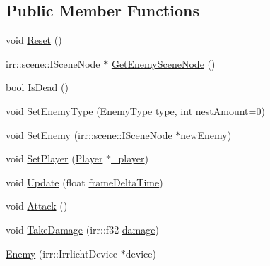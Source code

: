 \subsection*{Public Member Functions}
\begin{DoxyCompactItemize}
\item 
void \hyperlink{class_enemy_af6c878494349e5158e9e2f5ccbebe22d}{Reset} ()
\item 
irr\-::scene\-::\-I\-Scene\-Node $\ast$ \hyperlink{class_enemy_a85b8d7d8c6a61f8824a3b7b3fea795f4}{Get\-Enemy\-Scene\-Node} ()
\item 
bool \hyperlink{class_enemy_a019dd82194ff8415b0439cc375a88545}{Is\-Dead} ()
\item 
void \hyperlink{class_enemy_a567a82f1d7cb9034509459850f7784fc}{Set\-Enemy\-Type} (\hyperlink{class_enemy_a98c2ee2c2081001de17a4bc9fa8da94f}{Enemy\-Type} type, int nest\-Amount=0)
\item 
void \hyperlink{class_enemy_a927846998a0a936374a5734fb832b151}{Set\-Enemy} (irr\-::scene\-::\-I\-Scene\-Node $\ast$new\-Enemy)
\item 
void \hyperlink{class_enemy_a421d67f70801a3399ca22067fcde6dff}{Set\-Player} (\hyperlink{class_player}{Player} $\ast$\hyperlink{_enemy_spawner_8cpp_a9cd078164ceb4e9bfed2981b94610dc9}{\-\_\-player})
\item 
void \hyperlink{class_enemy_a2429c6f39d0b763f899bef2c035fa9c8}{Update} (float \hyperlink{_player_8cpp_adc988571147642cda93afbf89783f9c9}{frame\-Delta\-Time})
\item 
void \hyperlink{class_enemy_a9d077112e9af9e0bf92aa73ec20ea6ae}{Attack} ()
\item 
void \hyperlink{class_enemy_ab3567fe4213734615d7f3fed6c48a9c8}{Take\-Damage} (irr\-::f32 \hyperlink{class_enemy_a5d5917c222119c1d8eb3183c27c7adb7}{damage})
\item 
\hyperlink{class_enemy_a549b49efc0292397f778ddab5af279de}{Enemy} (irr\-::\-Irrlicht\-Device $\ast$device)
\end{DoxyCompactItemize}
